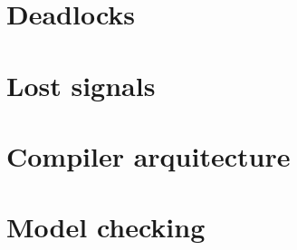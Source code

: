 \section{Deadlocks}

\section{Lost signals}

\section{Compiler arquitecture}

\section{Model checking}

\bigskip